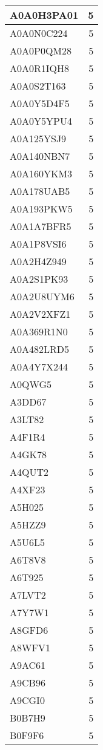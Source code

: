 \documentclass[
]{book}
\theoremstyle{definition}
\theoremstyle{definition}
\theoremstyle{definition}
\theoremstyle{definition}
\theoremstyle{remark}
\begin{document}
\begin{table}
\begin{tabular}{l|r}
A0A0H3PA01 & 5\\
\hline
A0A0N0C224 & 5\\
\hline
A0A0P0QM28 & 5\\
\hline
A0A0R1IQH8 & 5\\
\hline
A0A0S2T163 & 5\\
\hline
A0A0Y5D4F5 & 5\\
\hline
A0A0Y5YPU4 & 5\\
\hline
A0A125YSJ9 & 5\\
\hline
A0A140NBN7 & 5\\
\hline
A0A160YKM3 & 5\\
\hline
A0A178UAB5 & 5\\
\hline
A0A193PKW5 & 5\\
\hline
A0A1A7BFR5 & 5\\
\hline
A0A1P8VSI6 & 5\\
\hline
A0A2H4Z949 & 5\\
\hline
A0A2S1PK93 & 5\\
\hline
A0A2U8UYM6 & 5\\
\hline
A0A2V2XFZ1 & 5\\
\hline
A0A369R1N0 & 5\\
\hline
A0A482LRD5 & 5\\
\hline
A0A4Y7X244 & 5\\
\hline
A0QWG5 & 5\\
\hline
A3DD67 & 5\\
\hline
A3LT82 & 5\\
\hline
A4F1R4 & 5\\
\hline
A4GK78 & 5\\
\hline
A4QUT2 & 5\\
\hline
A4XF23 & 5\\
\hline
A5H025 & 5\\
\hline
A5HZZ9 & 5\\
\hline
A5U6L5 & 5\\
\hline
A6T8V8 & 5\\
\hline
A6T925 & 5\\
\hline
A7LVT2 & 5\\
\hline
A7Y7W1 & 5\\
\hline
A8GFD6 & 5\\
\hline
A8WFV1 & 5\\
\hline
A9AC61 & 5\\
\hline
A9CB96 & 5\\
\hline
A9CGI0 & 5\\
\hline
B0B7H9 & 5\\
\hline
B0F9F6 & 5\\
\hline

\end{tabular}
\end{table}
\end{document}
